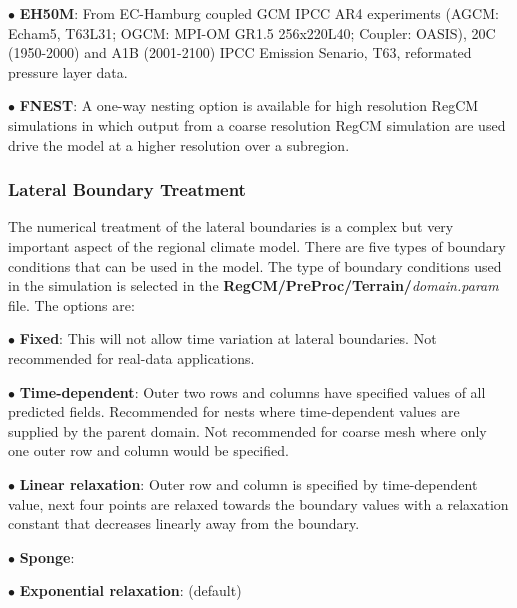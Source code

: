 $\bullet$  {\bf EH50M}: From EC-Hamburg coupled GCM IPCC AR4 experiments (AGCM: Echam5, T63L31; OGCM: MPI-OM GR1.5 256x220L40; Coupler: OASIS), 20C (1950-2000) and A1B (2001-2100) IPCC Emission Senario, T63, reformated pressure layer data.

$\bullet$  {\bf FNEST}:  A one-way nesting option is available for high resolution RegCM simulations in which output from a coarse resolution RegCM simulation are used drive the model at a higher resolution over a subregion. 

\subsubsection{Lateral Boundary Treatment}

\noindent The numerical treatment of the lateral boundaries is a complex but very 
important aspect of the regional climate model. There are five types of boundary conditions that can be used in the model. The type of boundary conditions used in the simulation is selected in the {\bf RegCM/PreProc/Terrain/}{\it domain.param} file. The options are:

${\bullet}$  {\bf Fixed}: This will not allow time variation at lateral boundaries. Not recommended for real-data applications.

${\bullet}$   {\bf Time-dependent}:  Outer two rows and columns have specified values of all predicted fields. Recommended for nests where time-dependent values are supplied by the parent domain. Not recommended for coarse mesh where only one outer row and column would be specified. 

${\bullet}$    {\bf Linear relaxation}: Outer row and column is specified by time-dependent value, next four points are relaxed towards the boundary values with a relaxation constant that decreases linearly away from the boundary.

${\bullet}$    {\bf Sponge}:  \cite{Perkey_76}

${\bullet}$    {\bf Exponential relaxation}:  \cite{Davies_77}  (default) 


